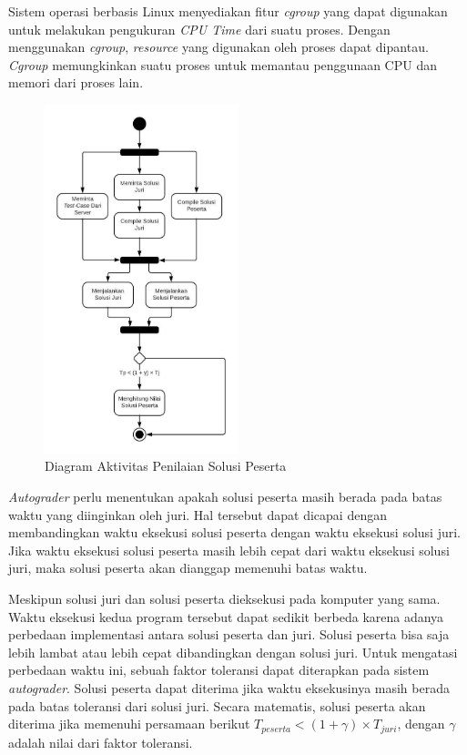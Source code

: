 \par Sistem operasi berbasis Linux menyediakan fitur \textit{cgroup} yang dapat digunakan untuk melakukan pengukuran \textit{CPU Time} dari suatu proses. Dengan menggunakan \textit{cgroup}, \textit{resource} yang digunakan oleh proses dapat dipantau. \textit{Cgroup} memungkinkan suatu proses untuk memantau penggunaan CPU dan memori dari proses lain. 

\begin{figure}[ht!]
    \centering
    \includegraphics[width=0.5\textwidth]{images/cpu-time-counting}
    \caption{Diagram Aktivitas Penilaian Solusi Peserta}
    \label{fig:cpu-time-counting}
\end{figure}

\par \textit{Autograder} perlu menentukan apakah solusi peserta masih berada pada batas waktu yang diinginkan oleh juri. Hal tersebut dapat dicapai dengan membandingkan waktu eksekusi solusi peserta dengan waktu eksekusi solusi juri. Jika waktu eksekusi solusi peserta masih lebih cepat dari waktu eksekusi solusi juri, maka solusi peserta akan dianggap memenuhi batas waktu.

\par Meskipun solusi juri dan solusi peserta dieksekusi pada komputer yang sama. Waktu eksekusi kedua program tersebut dapat sedikit berbeda karena adanya perbedaan implementasi antara solusi peserta dan juri. Solusi peserta bisa saja lebih lambat atau lebih cepat dibandingkan dengan solusi juri. Untuk mengatasi perbedaan waktu ini, sebuah faktor toleransi dapat diterapkan pada sistem \textit{autograder}. Solusi peserta dapat diterima jika waktu eksekusinya masih berada pada batas toleransi dari solusi juri. Secara matematis, solusi peserta akan diterima jika memenuhi persamaan berikut $ T_{peserta} < (1 + \gamma) \times T_{juri}$, dengan $\gamma$ adalah nilai dari faktor toleransi.

